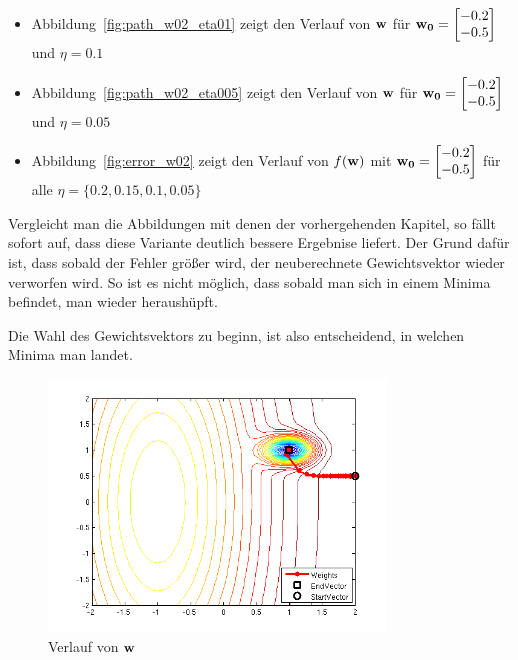 \begin{itemize}
  \item Abbildung~\ref{fig:path_w02_eta01} zeigt den Verlauf von $\mathbf{w}$ für $\mathbf{w_0} = \begin{bmatrix} -0.2 \\ -0.5 \end{bmatrix}$ und $\eta = 0.1$
  \item Abbildung~\ref{fig:path_w02_eta005} zeigt den Verlauf von $\mathbf{w}$ für $\mathbf{w_0} = \begin{bmatrix} -0.2 \\ -0.5 \end{bmatrix}$ und $\eta = 0.05$
  \item Abbildung~\ref{fig:error_w02} zeigt den Verlauf von $f(\mathbf{w})$ mit $\mathbf{w_0} = \begin{bmatrix} -0.2 \\ -0.5 \end{bmatrix}$ für alle $\eta = \{0.2, 0.15, 0.1, 0.05\}$
\end{itemize}

Vergleicht man die Abbildungen mit denen der vorhergehenden Kapitel, so fällt sofort auf, dass diese
Variante deutlich bessere Ergebnise liefert. Der Grund dafür ist, dass sobald der Fehler größer wird,
der neuberechnete Gewichtsvektor wieder verworfen wird. So ist es nicht möglich, dass sobald man sich in einem
Minima befindet, man wieder heraushüpft.

Die Wahl des Gewichtsvektors zu beginn, ist also entscheidend, in welchen Minima man landet.

\begin{figure}[h!]
  \centering
  \includegraphics[width=0.8\textwidth]{./figures/213/path_w01_eta02.png}
  \caption{Verlauf von $\mathbf{w}$}
  \label{fig:path_w01_eta02}
\end{figure}

